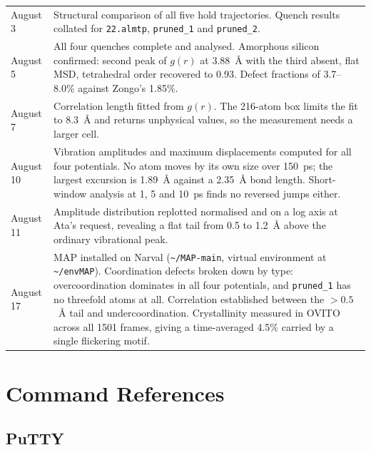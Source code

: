\documentclass{article}
\begin{document}
\begin{longtable}{l|p{}}
August 3 & Structural comparison of all five hold trajectories. Quench results collated for \texttt{22.almtp}, \texttt{pruned\_1} and \texttt{pruned\_2}. \\
August 5 & All four quenches complete and analysed. Amorphous silicon confirmed: second peak of $g(r)$ at 3.88~\AA{} with the third absent, flat MSD, tetrahedral order recovered to 0.93. Defect fractions of 3.7--8.0\% against Zongo's 1.85\%. \\
August 7 & Correlation length fitted from $g(r)$. The 216-atom box limits the fit to 8.3~\AA{} and returns unphysical values, so the measurement needs a larger cell. \\
August 10 & Vibration amplitudes and maximum displacements computed for all four potentials. No atom moves by its own size over 150~ps; the largest excursion is 1.89~\AA{} against a 2.35~\AA{} bond length. Short-window analysis at 1, 5 and 10~ps finds no reversed jumps either. \\
August 11 & Amplitude distribution replotted normalised and on a log axis at Ata's request, revealing a flat tail from 0.5 to 1.2~\AA{} above the ordinary vibrational peak. \\
August 17 & MAP installed on Narval (\texttt{\textasciitilde/MAP-main}, virtual environment at \texttt{\textasciitilde/envMAP}). Coordination defects broken down by type: overcoordination dominates in all four potentials, and \texttt{pruned\_1} has no threefold atoms at all. Correlation established between the $>0.5$~\AA{} tail and undercoordination. Crystallinity measured in OVITO across all 1501 frames, giving a time-averaged 4.5\% carried by a single flickering motif. \\
\end{longtable}

\section{Command References}
\subsection{PuTTY}
\end{document}
